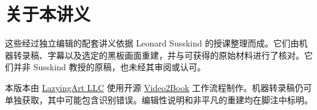 \documentclass[11pt,oneside]{book}
\begin{document}
\frontmatter
\hypersetup{pageanchor=false}

\hypersetup{pageanchor=true}

\clearpage
\chapter*{关于本讲义}
这些经过独立编辑的配套讲义依据 Leonard Susskind 的授课整理而成。它们由机器转录稿、字幕以及选定的黑板画面重建，并与可获得的原始材料进行了核对。它们并非 Susskind 教授的原稿，也未经其审阅或认可。

本版本由 \href{https://lazying.art}{LazyingArt LLC} 使用开源 \href{https://github.com/lachlanchen/Video2Book}{Video2Book} 工作流程制作。机器转录稿仍可单独获取，其中可能包含识别错误。编辑性说明和非平凡的重建均在脚注中标明。
\clearpage
\tableofcontents
\mainmatter










\end{document}
